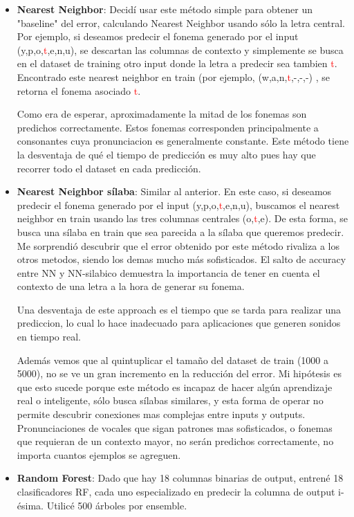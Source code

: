 \documentclass[paper=a4, fontsize=11pt]{scrartcl} %
\numberwithin{equation}{section} %
\numberwithin{figure}{section} %
\numberwithin{table}{section} %
\begin{document}
\begin{itemize}
\item \textbf{Nearest Neighbor}: Decidí usar este método simple para obtener un "baseline" del error, calculando Nearest Neighbor usando sólo la letra central. Por ejemplo, si deseamos predecir el fonema generado por el input (y,p,o,\textcolor{red}{t},e,n,u), se descartan las columnas de contexto y simplemente se busca en el dataset de training otro input donde la letra a predecir sea tambien \textcolor{red}{t}. Encontrado este nearest neighbor en train (por ejemplo, (w,a,n,\textcolor{red}{t},-,-,-) , se retorna el fonema asociado \textcolor{red}{t}.

Como era de esperar, aproximadamente la mitad de los fonemas son predichos correctamente. Estos fonemas corresponden principalmente a consonantes cuya pronunciacion es generalmente constante. Este método tiene la desventaja de qué el tiempo de predicción es muy alto pues hay que recorrer todo el dataset en cada predicción.

\item \textbf{Nearest Neighbor sílaba}: Similar al anterior. En este caso, si deseamos predecir el fonema generado por el input (y,p,o,\textcolor{red}{t},e,n,u), buscamos el nearest neighbor en train usando las tres columnas centrales (o,\textcolor{red}{t},e). De esta forma, se busca una sílaba en train que sea parecida a la sílaba que queremos predecir. Me sorprendió descubrir que el error obtenido por este método rivaliza a los otros metodos, siendo los demas mucho más sofisticados. El salto de accuracy entre NN y NN-silabico demuestra la importancia de tener en cuenta el contexto de una letra a la hora de generar su fonema.

Una desventaja de este approach es el tiempo que se tarda para realizar una prediccion, lo cual lo hace inadecuado para aplicaciones que generen sonidos en tiempo real. 

Además vemos que al quintuplicar el tamaño del dataset de train (1000 a 5000), no se ve un gran incremento en la reducción del error. Mi hipótesis es que esto sucede porque este método es incapaz de hacer algún aprendizaje real o inteligente, sólo busca sílabas similares, y esta forma de operar no permite descubrir conexiones mas complejas entre inputs y outputs. Pronunciaciones de vocales que sigan patrones mas sofisticados, o fonemas que requieran de un contexto mayor, no serán predichos correctamente, no importa cuantos ejemplos se agreguen.

\item \textbf{Random Forest}: Dado que hay 18 columnas binarias de output, entrené 18 clasificadores RF, cada uno especializado en predecir la columna de output i-ésima. Utilicé 500 árboles por ensemble.


\end{itemize}
\end{document}
